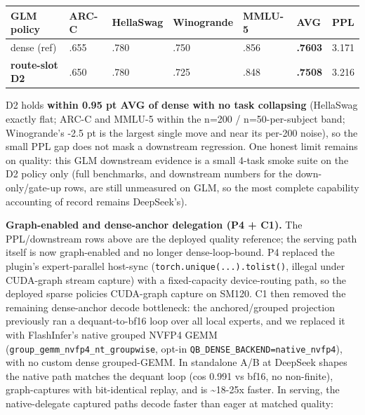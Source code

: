 \documentclass[
]{article}
\begin{document}
\begin{longtable}[]{@{}lllllll@{}}
\toprule\noalign{}
GLM policy & ARC-C & HellaSwag & Winogrande & MMLU-5 & AVG & PPL \\
\midrule\noalign{}
\endhead
\bottomrule\noalign{}
\endlastfoot
dense (ref) & .655 & .780 & .750 & .856 & \textbf{.7603} & 3.171 \\
\textbf{route-slot D2} & .650 & .780 & .725 & .848 & \textbf{.7508} &
3.216 \\
\end{longtable}

D2 holds \textbf{within 0.95 pt AVG of dense with no task collapsing}
(HellaSwag exactly flat; ARC-C and MMLU-5 within the n=200 /
n=50-per-subject band; Winogrande's -2.5 pt is the largest single move
and near its per-200 noise), so the small PPL gap does not mask a
downstream regression. One honest limit remains on quality: this GLM
downstream evidence is a small 4-task smoke suite on the D2 policy only
(full benchmarks, and downstream numbers for the down-only/gate-up rows,
are still unmeasured on GLM, so the most complete capability accounting
of record remains DeepSeek's).

\textbf{Graph-enabled and dense-anchor delegation (P4 + C1).} The
PPL/downstream rows above are the deployed quality reference; the
serving path itself is now graph-enabled and no longer dense-loop-bound.
P4 replaced the plugin's expert-parallel host-sync
(\texttt{torch.unique(...).tolist()}, illegal under CUDA-graph stream
capture) with a fixed-capacity device-routing path, so the deployed
sparse policies CUDA-graph capture on SM120. C1 then removed the
remaining dense-anchor decode bottleneck: the anchored/grouped
projection previously ran a dequant-to-bf16 loop over all local experts,
and we replaced it with FlashInfer's native grouped NVFP4 GEMM
(\texttt{group\_gemm\_nvfp4\_nt\_groupwise}, opt-in
\texttt{QB\_DENSE\_BACKEND=native\_nvfp4}), with no custom dense
grouped-GEMM. In standalone A/B at DeepSeek shapes the native path
matches the dequant loop (cos 0.991 vs bf16, no non-finite),
graph-captures with bit-identical replay, and is \textasciitilde18-25x
faster. In serving, the native-delegate captured paths decode faster
than eager at matched quality:
\end{document}
